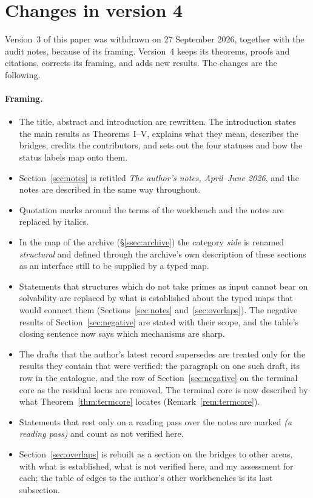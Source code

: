 \section{Changes in version 4}\label{app:changes}

Version~3 of this paper was withdrawn on 27 September 2026, together with the audit notes, because of its framing. Version~4 keeps its theorems, proofs and citations, corrects its framing, and adds new results. The changes are the following.

\paragraph{Framing.}
\begin{itemize}
\item The title, abstract and introduction are rewritten. The introduction states the main results as Theorems~I--V, explains what they mean, describes the bridges, credits the contributors, and sets out the four statuses and how the status labels map onto them.
\item Section~\ref{sec:notes} is retitled \emph{The author's notes, April--June 2026}, and the notes are described in the same way throughout.
\item Quotation marks around the terms of the workbench and the notes are replaced by italics.
\item In the map of the archive (§\ref{ssec:archive}) the category \emph{side} is renamed \emph{structural} and defined through the archive's own description of these sections as an interface still to be supplied by a typed map.
\item Statements that structures which do not take primes as input cannot bear on solvability are replaced by what is established about the typed maps that would connect them (Sections~\ref{sec:notes} and~\ref{sec:overlaps}). The negative results of Section~\ref{sec:negative} are stated with their scope, and the table's closing sentence now says which mechanisms are sharp.
\item The drafts that the author's latest record supersedes are treated only for the results they contain that were verified: the paragraph on one such draft, its row in the catalogue, and the row of Section~\ref{sec:negative} on the terminal core as the residual locus are removed. The terminal core is now described by what Theorem~\ref{thm:termcore} locates (Remark~\ref{rem:termcore}).
\item Statements that rest only on a reading pass over the notes are marked \emph{(a reading pass)} and count as not verified here.
\item Section~\ref{sec:overlaps} is rebuilt as a section on the bridges to other areas, with what is established, what is not verified here, and my assessment for each; the table of edges to the author's other workbenches is its last subsection.
\end{itemize}

